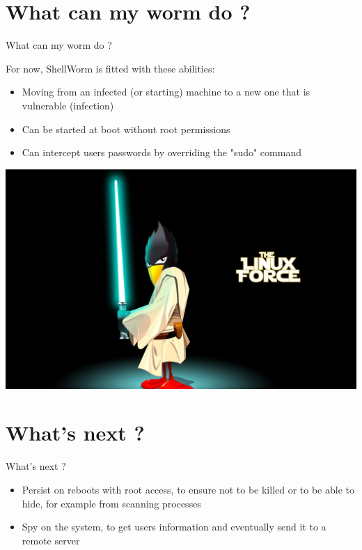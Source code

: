 \documentclass[11pt]{beamer}
\begin{document}
\section{What can my worm do ?}
\begin{frame}{What can my worm do ?}

For now, ShellWorm is fitted with these abilities:
\begin{itemize}
\item Moving from an infected (or starting) machine to a new one that is vulnerable (infection)
\item Can be started at boot without root permissions 
\item Can intercept users passwords by overriding the "sudo" command
\end{itemize}


\begin{center}
\includegraphics[scale=0.08]{linux_force.jpg}
\end{center}
\end{frame}

\section{What's next ?}
\begin{frame}{What's next ?}
\begin{itemize}
\item Persist on reboots with root access, to ensure not to be killed or to be able to hide, for example from scanning processes
\item Spy on the system, to get users information and eventually  send it to a remote server
\end{itemize}
\end{frame}
\end{document}
